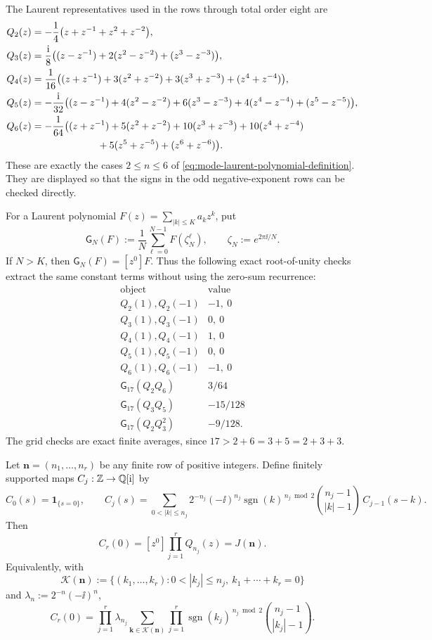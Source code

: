 The Laurent representatives used in the rows through total order eight are
\begin{align}
Q_2(z)
&=-\frac14\bigl(z+z^{-1}+z^2+z^{-2}\bigr),
\label{eq:appendix-d-explicit-q2}\\
Q_3(z)
&=\frac{\mathrm{i}}{8}\bigl((z-z^{-1})+2(z^2-z^{-2})+(z^3-z^{-3})\bigr),
\label{eq:appendix-d-explicit-q3}\\
Q_4(z)
&=\frac1{16}\bigl((z+z^{-1})+3(z^2+z^{-2})
  +3(z^3+z^{-3})+(z^4+z^{-4})\bigr),
\label{eq:appendix-d-explicit-q4}\\
Q_5(z)
&=-\frac{\mathrm{i}}{32}\bigl((z-z^{-1})+4(z^2-z^{-2})
  +6(z^3-z^{-3})+4(z^4-z^{-4})+(z^5-z^{-5})\bigr),
\label{eq:appendix-d-explicit-q5}\\
Q_6(z)
&=-\frac1{64}\bigl((z+z^{-1})+5(z^2+z^{-2})
  +10(z^3+z^{-3})+10(z^4+z^{-4}) \nonumber\\
&\hspace{6.7em}
  +5(z^5+z^{-5})+(z^6+z^{-6})\bigr).
\label{eq:appendix-d-explicit-q6}
\end{align}
These are exactly the cases \(2\le n\le6\) of
\eqref{eq:mode-laurent-polynomial-definition}.  They are displayed so that
the signs in the odd negative-exponent rows can be checked directly.

For a Laurent polynomial \(F(z)=\sum_{|k|\le K}a_kz^k\), put
\[
\mathsf G_N(F):=\frac1N\sum_{\ell=0}^{N-1}F(\zeta_N^\ell),
\qquad \zeta_N:=e^{2\pi\ii/N}.
\]
If \(N>K\), then \(\mathsf G_N(F)=[z^0]F\).  Thus the following exact
root-of-unity checks extract the same constant terms without using the
zero-sum recurrence:
\[
\begin{array}{c|c}
\text{object}&\text{value}\\
\hline
Q_2(1),Q_2(-1)&-1,\ 0\\
Q_3(1),Q_3(-1)&0,\ 0\\
Q_4(1),Q_4(-1)&1,\ 0\\
Q_5(1),Q_5(-1)&0,\ 0\\
Q_6(1),Q_6(-1)&-1,\ 0\\
\mathsf G_{17}(Q_2Q_6)&3/64\\
\mathsf G_{17}(Q_3Q_5)&-15/128\\
\mathsf G_{17}(Q_2Q_3^2)&-9/128 .
\end{array}
\]
The grid checks are exact finite averages, since
\(17>2+6=3+5=2+3+3\).

\begin{lemma}%
\label{lem:appendix-d-deterministic-laurent-recurrence}
Let \(\mathbf n=(n_1,\ldots,n_r)\) be any finite row of positive integers.
Define finitely supported maps \(C_j:\mathbb{Z}\to\mathbb{Q}[\mathrm{i}]\) by
\[
C_0(s)=\mathbf 1_{\{s=0\}},\qquad
C_j(s)=\sum_{0<|k|\le n_j}
2^{-n_j}(-\ii)^{n_j}\operatorname{sgn}(k)^{\,n_j\bmod2}
\binom{n_j-1}{|k|-1}\,C_{j-1}(s-k).
\]
Then
\[
  C_r(0)=[z^0]\prod_{j=1}^r Q_{n_j}(z)=J(\mathbf n).
\]
Equivalently, with
\[
\mathcal K(\mathbf n)
:=\{(k_1,\ldots,k_r):0<|k_j|\le n_j,\ k_1+\cdots+k_r=0\}
\]
and \(\lambda_n:=2^{-n}(-\ii)^n\),
\[
C_r(0)=
\prod_{j=1}^r\lambda_{n_j}
\sum_{\mathbf k\in\mathcal K(\mathbf n)}
\prod_{j=1}^r
\operatorname{sgn}(k_j)^{\,n_j\bmod2}
\binom{n_j-1}{|k_j|-1}.
\]
\end{lemma}

